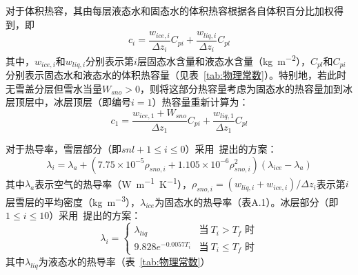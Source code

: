 对于体积热容，其由每层液态水和固态水的体积热容根据各自体积百分比加权得到，即
\begin{equation}
    c_i = \frac{w_{ice,i}}{\Delta z_i}C_{pi} + \frac{w_{liq,i}}{\Delta z_i}C_{pl}
\end{equation}
其中，$w_{ice,i}$和$w_{liq,i}$分别表示第$i$层固态水含量和液态水含量（\unit{kg.m^{-2}}），$C_{pl}$和$C_{pi}$分别表示固态水和液态水的体积热容量（见表~\ref{tab:物理常数}）。特别地，若此时无雪盖分层但雪水当量$W_{sno}>0$，则将这部分热容量考虑为固态水的热容量加到冰层顶层中，冰层顶层（即编号$i=1$）热容量重新计算为：
\begin{equation}
    c_1 = \frac{w_{ice,1}+W_{sno}}{\Delta z_1}C_{pi} + \frac{w_{liq,1}}{\Delta z_1}C_{pl}
\end{equation}

对于热导率，雪层部分（即$snl+1\leqslant i\leqslant 0$）采用~\citet{jordan1991one}提出的方案：
\begin{equation}
    \lambda_i = \lambda_a + \left(7.75 \times 10^{-5} \rho_{sno,i} + 1.105\times 10^{-6} \rho^2_{sno,i}\right)\left(\lambda_{ice}-\lambda_a\right)
\end{equation}
其中$\lambda_a$表示空气的热导率（\unit{W.m^{-1}.K^{-1}}），$\rho_{sno,i}=\left(w_{liq,i}+w_{ice,i}\right)/\Delta z_i$表示第$i$层雪层的平均密度（\unit{kg.m^{-3}}），$\lambda_{ice}$为固态水的热导率（表A.1）。冰层部分（即$1\leqslant i \leqslant 10$）采用~\citet{yen1981review}提出的方案：
\begin{equation}
    \lambda_i =\begin{cases}
        \lambda_{liq} &\text{当}\ T_i > T_f \text{ 时} \\
        9.828 e^{-0.0057 T_i} &\text{当}\ T_i \leqslant T_f \text{ 时}
    \end{cases}
\end{equation}
其中$\lambda_{liq}$为液态水的热导率（表~\ref{tab:物理常数}）


